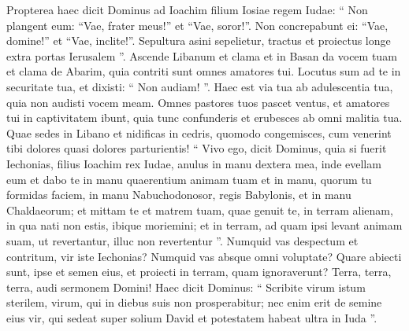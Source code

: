 \begin{biblechapter}
\begin{biblechapter}
\begin{biblechapter}
\begin{biblechapter}
\begin{biblechapter}
\begin{biblechapter}
\begin{biblechapter}
\begin{biblechapter}
\begin{biblechapter}
\begin{biblechapter}
\begin{biblechapter}
\begin{biblechapter}
\begin{biblechapter}
\begin{biblechapter}
\begin{biblechapter}
\begin{biblechapter}
\begin{biblechapter}
\begin{biblechapter}
\begin{biblechapter}
\begin{biblechapter}
\begin{biblechapter}
\begin{biblechapter}
 \verse Propterea haec dicit Dominus ad Ioachim filium Iosiae regem Iudae:
 “ Non plangent eum:
 “Vae, frater meus!” et “Vae, soror!”.
 Non concrepabunt ei:
 “Vae, domine!” et “Vae, inclite!”.
 \verse Sepultura asini sepelietur,
 tractus et proiectus longe
 extra portas Ierusalem ”.
 \verse Ascende Libanum et clama
 et in Basan da vocem tuam
 et clama de Abarim,
 quia contriti sunt omnes amatores tui.
 \verse Locutus sum ad te in securitate tua,
 et dixisti: “ Non audiam! ”.
 Haec est via tua ab adulescentia tua,
 quia non audisti vocem meam.
 \verse Omnes pastores tuos pascet ventus,
 et amatores tui in captivitatem ibunt,
 quia tunc confunderis et erubesces
 ab omni malitia tua.
 \verse Quae sedes in Libano
 et nidificas in cedris,
 quomodo congemisces,
 cum venerint tibi dolores
 quasi dolores parturientis!
 \verse “ Vivo ego, dicit Dominus, quia si fuerit Iechonias, filius Ioachim rex Iudae, anulus in manu dextera mea, inde evellam eum 
\verse et dabo te in manu quaerentium animam tuam et in manu, quorum tu formidas faciem, in manu Nabuchodonosor, regis Babylonis, et in manu Chaldaeorum; 
\verse et mittam te et matrem tuam, quae genuit te, in terram alienam, in qua nati non estis, ibique moriemini; 
\verse et in terram, ad quam ipsi levant animam suam, ut revertantur, illuc non revertentur ”.
 \verse Numquid vas despectum et contritum, vir iste Iechonias? Numquid vas absque omni voluptate? Quare abiecti sunt, ipse et semen eius, et proiecti in terram, quam ignoraverunt? 
\verse Terra, terra, terra, audi sermonem Domini! 
\verse Haec dicit Dominus: “ Scribite virum istum sterilem, virum, qui in diebus suis non prosperabitur; nec enim erit de semine eius vir, qui sedeat super solium David et potestatem habeat ultra in Iuda ”.
 

\end{biblechapter}
\end{biblechapter}
\end{biblechapter}
\end{biblechapter}
\end{biblechapter}
\end{biblechapter}
\end{biblechapter}
\end{biblechapter}
\end{biblechapter}
\end{biblechapter}
\end{biblechapter}
\end{biblechapter}
\end{biblechapter}
\end{biblechapter}
\end{biblechapter}
\end{biblechapter}
\end{biblechapter}
\end{biblechapter}
\end{biblechapter}
\end{biblechapter}
\end{biblechapter}
\end{biblechapter}
